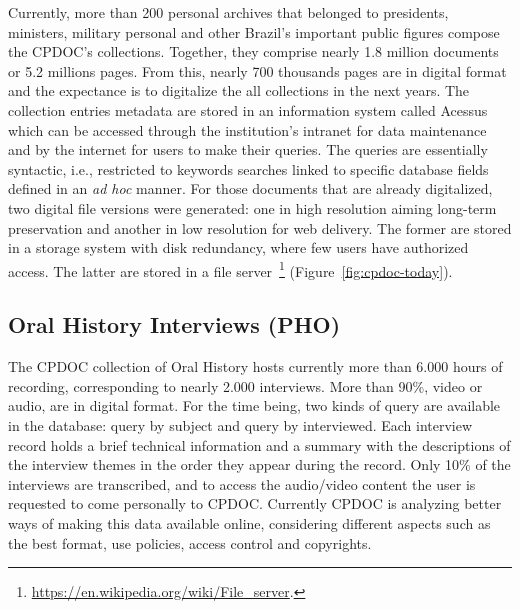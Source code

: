 Currently, more than 200 personal archives that belonged to
presidents, ministers, military personal and other Brazil's important
public figures compose the CPDOC's collections.  Together, they
comprise nearly 1.8 million documents or 5.2 millions pages. From
this, nearly 700 thousands pages are in digital format and the
expectance is to digitalize the all collections in the next years. The
collection entries metadata are stored in an information system called
Acessus which can be accessed through the institution's intranet for
data maintenance and by the internet for users to make their queries.
The queries are essentially syntactic, i.e.,
restricted to keywords searches linked to specific database fields
defined in an \emph{ad hoc} manner.  For those documents that are
already digitalized, two digital file versions were generated: one in
high resolution aiming long-term preservation and another in low
resolution for web delivery. The former are stored in a storage system
with disk redundancy, where few users have authorized access. The
latter are stored in a file
server~\footnote{\url{https://en.wikipedia.org/wiki/File_server}.}
(Figure~\ref{fig:cpdoc-today}).

\subsection{Oral History Interviews (PHO)}

The CPDOC collection of Oral History hosts currently more than 6.000
hours of recording, corresponding to nearly 2.000 interviews.  More
than 90\%, video or audio, are in digital format.  For the time being,
two kinds of query are available in the database: query by subject and
query by interviewed. Each interview record holds a brief technical
information and a summary with the descriptions of the interview
themes in the order they appear during the record. Only 10\% of the
interviews are transcribed, and to access the audio/video content the
user is requested to come personally to CPDOC. Currently CPDOC is
analyzing better ways of making this data available online,
considering different aspects such as the best format, use policies,
access control and copyrights.

